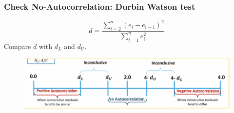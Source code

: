 \documentclass[11pt,a4paper]{article}
\begin{document}
\subsubsection{Check No-Autocorrelation: Durbin Watson test}
$$d=\frac{\sum_{i=2}^n(e_i-e_{i-1})^2}{\sum_{i=1}^ne_i^2}$$
Compare $d$ with $d_L$ and $d_U$.
\begin{center}\begin{figure}[htbp]
    \centering
    \includegraphics[scale=0.5]{check4.png}
    \caption{}
    \label{}
\end{figure}\end{center}
\end{document}
